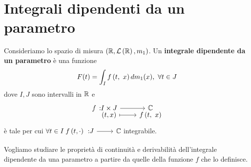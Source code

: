\section{Integrali dipendenti da un parametro}
\begin{define}
	Consideriamo lo spazio di misura $\left(\mathbb{R},\mathcal{L}\left(\mathbb{R}\right),m_1\right)$. Un \textbf{integrale dipendente da un parametro} è una funzione
	\begin{equation}
		F(t)=\int_If\left(t,\ x\right)dm_1(x),\ \forall t\in J
	\end{equation}
	dove $I,J$ sono intervalli in $\mathbb{R}$ e
	\begin{equation*}
		\funztot{f}{I\times J}{\complexset}{\left(t,x\right)}{\mvf{f}{t}{x}}
	\end{equation*}
	è tale per cui $\forall t\in I\ \funz{f\left(t,\cdot\right)}{J}{\complexset}$ integrabile.
\end{define}
Vogliamo studiare le proprietà di continuità e derivabilità dell'integrale dipendente da una parametro a partire da quelle della funzione $f$ che lo definisce.
